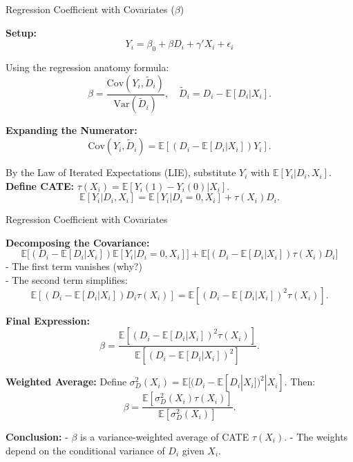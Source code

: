 \documentclass[xcolor=svgnames,t]{beamer}
\begin{document}
\begin{frame}{Regression Coefficient with Covariates (\(\beta\))}

    \textbf{Setup:}
    \[
    Y_i = \beta_0 + \beta D_i + \gamma' X_i + \epsilon_i
    \]
    \pause
    
    
    \pause
    
    Using the regression anatomy formula:
    \[
    \beta = \frac{\text{Cov}(Y_i, \tilde{D}_i)}{\text{Var}(\tilde{D}_i)}, \quad \tilde{D}_i = D_i - \mathbb{E}[D_i | X_i].
    \]
    \pause
    
    \textbf{Expanding the Numerator:}
    \[
    \text{Cov}(Y_i, \tilde{D}_i) = \mathbb{E}[(D_i - \mathbb{E}[D_i | X_i]) Y_i].
    \]
    \pause
    
    By the Law of Iterated Expectations (LIE), substitute \(Y_i\) with \(\mathbb{E}[Y_i | D_i, X_i]\). \textbf{Define CATE:}
    \(
    \tau(X_i) = \mathbb{E}[Y_i(1) - Y_i(0) | X_i].
    \)
    \[
    \mathbb{E}[Y_i | D_i, X_i] = \mathbb{E}[Y_i | D_i = 0, X_i] + \tau(X_i) D_i.
    \]
    
    \end{frame}
    

    \begin{frame}{Regression Coefficient with Covariates}

        \textbf{Decomposing the Covariance:}
        \[
        \mathbb{E}\big[(D_i - \mathbb{E}[D_i | X_i]) \mathbb{E}[Y_i | D_i = 0, X_i]\big] + \mathbb{E}\big[(D_i - \mathbb{E}[D_i | X_i]) \tau(X_i) D_i\big]
        \]
        \pause
        - The first term vanishes (why?)\\
        \pause
        - The second term simplifies:
        \[
        \mathbb{E}[(D_i - \mathbb{E}[D_i | X_i]) D_i \tau(X_i)] = \mathbb{E}[(D_i - \mathbb{E}[D_i | X_i])^2 \tau(X_i)].
        \]
        
        \pause
        \textbf{Final Expression:}
        \[
        \beta = \frac{\mathbb{E}[(D_i - \mathbb{E}[D_i | X_i])^2 \tau(X_i)]}{\mathbb{E}[(D_i - \mathbb{E}[D_i | X_i])^2]}.
        \]
        
        \pause
        \textbf{Weighted Average:}
        Define \(\sigma^2_D(X_i) = \mathbb{E}[(D_i - \mathbb{E}[D_i | X_i])^2 | X_i]\). Then:
        \[
        \beta = \frac{\mathbb{E}[\sigma^2_D(X_i) \tau(X_i)]}{\mathbb{E}[\sigma^2_D(X_i)]}.
        \]
        
        \textbf{Conclusion:}
        - \(\beta\) is a variance-weighted average of CATE \(\tau(X_i)\).
        - The weights depend on the conditional variance of \(D_i\) given \(X_i\).
        
        \end{frame}
        
\end{document}
